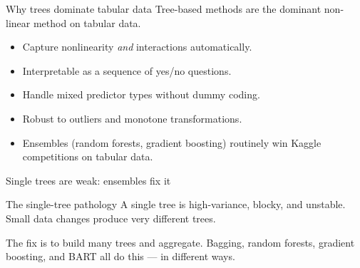 \documentclass[aspectratio=169,11pt]{beamer}
\begin{document}
\begin{frame}{Why trees dominate tabular data}
  Tree-based methods are the dominant non-linear method on tabular
  data.
  \begin{takeaway}
    \begin{itemize}
      \item Capture nonlinearity \emph{and} interactions automatically.
      \item Interpretable as a sequence of yes/no questions.
      \item Handle mixed predictor types without dummy coding.
      \item Robust to outliers and monotone transformations.
      \item Ensembles (random forests, gradient boosting) routinely
            win Kaggle competitions on tabular data.
    \end{itemize}
  \end{takeaway}
\end{frame}

\begin{frame}{Single trees are weak: ensembles fix it}
  \begin{alertblock}{The single-tree pathology}
    A single tree is high-variance, blocky, and unstable. Small data
    changes produce very different trees.
  \end{alertblock}
  \begin{takeaway}
    The fix is to build many trees and aggregate. Bagging, random
    forests, gradient boosting, and BART all do this --- in different
    ways.
  \end{takeaway}
\end{frame}
\end{document}
